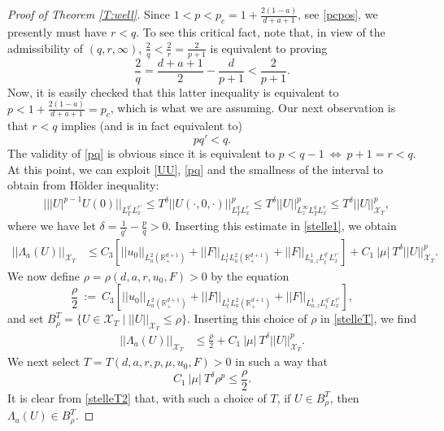 \documentclass[11pt,letter]{amsart}
\def \RN {\mathbb{R}_+^{d+1}}
\numberwithin{equation}{section}
\newcommand{\XT}{\mathcal{X}_T}
\numberwithin{equation}{section}
\begin{document}
\begin{proof}[Proof of Theorem \ref{T:well}]
Since $1<p<p_c = 1 + \frac{2(1-a)}{d+a+1}$, see \eqref{pcpos}, we presently must have $r<q$. To see this critical fact, note that, in view of the admissibility of $(q,r,\infty)$, $\frac 2q < \frac 2r = \frac{2}{p+1}$ is equivalent to proving
\[
\frac 2q = \frac{d+a+1}2 - \frac{d}{p+1} < \frac{2}{p+1}.
\]
Now, it is easily checked that this latter inequality is equivalent to $p < 1 + \frac{2(1-a)}{d+a+1} = p_c$, which is what we are assuming. Our next observation is that $r<q$ implies (and is in fact equivalent to)
\begin{equation}\label{pq}
p q' < q.
\end{equation}
The validity of \eqref{pq} is obvious since it is equivalent to $p<q-1\ \Longleftrightarrow\  p+1 = r <q$. At this point, we can exploit \eqref{UU}, \eqref{pq} and the smallness of the interval  
to obtain from H\"older inequality:
\begin{align}\label{Upq}
& |||U|^{p-1} U(0)||_{L^{q'}_T L^{r'}_x} 
\le T^{\delta} ||U(\cdot,0,\cdot)||^p_{L^{q}_T L^r_x}
 \le T^\delta ||U||^p_{L^\infty_z L^{q}_T L^{r}_x } \le T^\delta ||U||_{\XT}^p,
\end{align}
where we have let $\delta = \frac{1}{q'} - \frac{p}{q}>0$.
Inserting this estimate in \eqref{stelle1}, we obtain
\begin{align}\label{stelleT}
||\Lambda_a(U)||_{\XT} & \le C_3 \left[||u_0||_{L^2_a(\RN)} + ||F||_{L^1_t L^2_a(\RN)} + ||F||_{L^1_{a,z} L^{q'}_t L^{r'}_x}\right]
 +  C_1\ |\mu|\ T^\delta ||U||_{\XT}^p.
\end{align}
We now define $\rho = \rho(d,a,r, u_0, F)>0$ by the equation
\begin{equation}\label{choose}
\frac{\rho}2\ :=\ C_3 \left[||u_0||_{L^2_a(\RN)} + ||F||_{L^1_t L^2_a(\RN)} + ||F||_{L^1_{a,z} L^{q'}_t L^{r'}_x}\right],
\end{equation}
and set $B^T_\rho = \{U\in \XT\mid ||U||_{\XT}\le \rho\}$.
Inserting this choice of $\rho$ in \eqref{stelleT}, we find
\begin{align}\label{stelleT2}
||\Lambda_a(U)||_{\XT} & \le \frac{\rho}2
 +  C_1\ |\mu|\ T^\delta ||U||_{\XT}^p.
\end{align}
We next select $T = T(d,a,r,p,\mu,u_0,F)>0$ in such a  way that
\[
C_1\ |\mu|\ T^\delta \rho^p \le \frac{\rho}2.
\]
It is clear from \eqref{stelleT2} that, with such a choice of $T$, if $U\in B^T_\rho$, then $\Lambda_a(U)\in B^T_\rho$. 


\end{proof}
\end{document}

